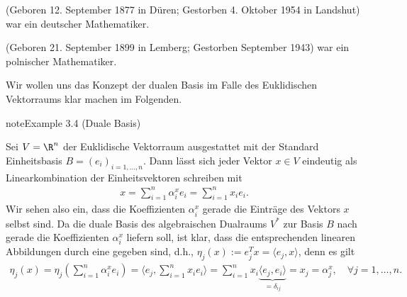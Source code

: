 \documentclass[letterpaper,10pt,english]{jupyterBook}
\begin{document}
\begin{sphinxShadowBox}

\sphinxAtStartPar
{} (Geboren 12. September 1877 in Düren; Gestorben 4. Oktober 1954 in Landshut) war ein deutscher Mathematiker.
\end{sphinxShadowBox}

\begin{sphinxShadowBox}

\sphinxAtStartPar
{} (Geboren 21. September 1899 in Lemberg; Gestorben September 1943) war ein polnischer Mathematiker.
\end{sphinxShadowBox}

\sphinxAtStartPar
Wir wollen uns das Konzept der dualen Basis im Falle des Euklidischen Vektorraums klar machen im Folgenden.
\label{vektoranalysis/multilinear:example-12}
\begin{sphinxadmonition}{note}{Example 3.4 (Duale Basis)}



\sphinxAtStartPar
Sei \(V = \R^n\) der Euklidische Vektorraum ausgestattet mit der Standard Einheitsbasis \(B = (e_i)_{i=1,\ldots,n}\).
Dann lässt sich jeder Vektor \(x \in V\) eindeutig als Linearkombination der Einheitsvektoren schreiben mit
\begin{equation*}
\begin{split}x = \sum_{i=1}^n \alpha_i^x e_i = \sum_{i=1}^n x_i e_i.\end{split}
\end{equation*}
\sphinxAtStartPar
Wir sehen also ein, dass die Koeffizienten \(\alpha_i^x\) gerade die Einträge des Vektors \(x\) selbst sind.
Da die duale Basis des algebraischen Dualraums \(V^\ast\) zur Basis \(B\) nach {\hyperref[\detokenize{vektoranalysis/multilinear:lem:dualeBasis}]{}} gerade die Koeffizienten \(\alpha_i^x\) liefern soll, ist klar, dass die entsprechenden linearen Abbildungen durch eine  gegeben sind, d.h., \(\eta_j(x) := e_j^T x = \langle e_j, x \rangle\), denn es gilt
\begin{equation*}
\begin{split}\eta_j(x) = 
\eta_j \left( \sum_{i=1}^n \alpha_i^x e_i \right) = 
\langle e_j, \sum_{i=1}^n x_i e_i\rangle =
\sum_{i=1}^n x_i \underbrace{\langle e_j, e_i\rangle}_{= \delta_{ij}} =  
x_j = \alpha_j^x, \quad \forall j=1,\ldots,n.\end{split}
\end{equation*}\end{sphinxadmonition}
\end{document}
